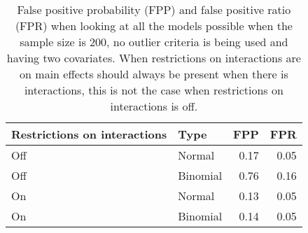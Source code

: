 \begin{longtable}{llrr}
\caption{False positive probability (FPP) and false positive ratio (FPR) when looking at all the models possible when the sample size is 200, no outlier criteria is being used and having two covariates. When restrictions on interactions are on main effects should always be present when there is interactions, this is not the case when restrictions on interactions is off. } \\ 
  \hline
Restrictions on interactions & Type & FPP & FPR \\ 
  \hline
Off & Normal & 0.17 & 0.05 \\ 
  Off & Binomial & 0.76 & 0.16 \\ 
  On & Normal & 0.13 & 0.05 \\ 
  On & Binomial & 0.14 & 0.05 \\ 
   \hline
\hline
\end{longtable}
